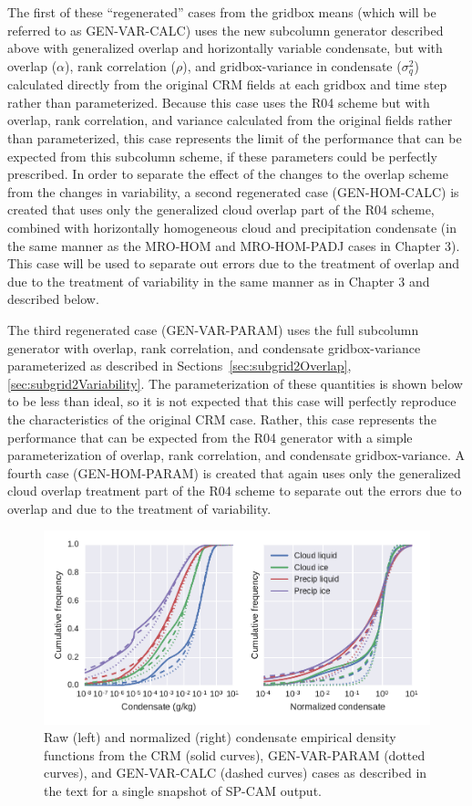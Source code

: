 The first of these ``regenerated'' cases from the gridbox means (which
will be referred to as GEN-VAR-CALC) uses the new subcolumn generator
described above with generalized overlap and horizontally variable
condensate, but with overlap (\(\alpha\)), rank correlation (\(\rho\)),
and gridbox-variance in condensate (\(\sigma_q^2\)) calculated directly
from the original CRM fields at each gridbox and time step rather than
parameterized. Because this case uses the R04 scheme but with overlap,
rank correlation, and variance calculated from the original fields
rather than parameterized, this case represents the limit of the
performance that can be expected from this subcolumn scheme, if these
parameters could be perfectly prescribed. In order to separate the
effect of the changes to the overlap scheme from the changes in
variability, a second regenerated case (GEN-HOM-CALC) is created that
uses only the generalized cloud overlap part of the R04 scheme, combined
with horizontally homogeneous cloud and precipitation condensate (in the
same manner as the MRO-HOM and MRO-HOM-PADJ cases in Chapter 3). This
case will be used to separate out errors due to the treatment of overlap
and due to the treatment of variability in the same manner as in Chapter
3 and described below.

The third regenerated case (GEN-VAR-PARAM) uses the full subcolumn
generator with overlap, rank correlation, and condensate
gridbox-variance parameterized as described in
Sections~\ref{sec:subgrid2Overlap}, \ref{sec:subgrid2Variability}. The
parameterization of these quantities is shown below to be less than
ideal, so it is not expected that this case will perfectly reproduce the
characteristics of the original CRM case. Rather, this case represents
the performance that can be expected from the R04 generator with a
simple parameterization of overlap, rank correlation, and condensate
gridbox-variance. A fourth case (GEN-HOM-PARAM) is created that again
uses only the generalized cloud overlap treatment part of the R04 scheme
to separate out the errors due to overlap and due to the treatment of
variability.

\begin{figure}[htbp]
\centering
\includegraphics{graphics/subgrid2_mxratio_cdf2.pdf}
\caption{\label{fig:mxratioCDF2}Raw (left) and normalized (right)
condensate empirical density functions from the CRM (solid curves),
GEN-VAR-PARAM (dotted curves), and GEN-VAR-CALC (dashed curves) cases as
described in the text for a single snapshot of SP-CAM
output.}\label{fig:mxratioCDF2}
\end{figure}

